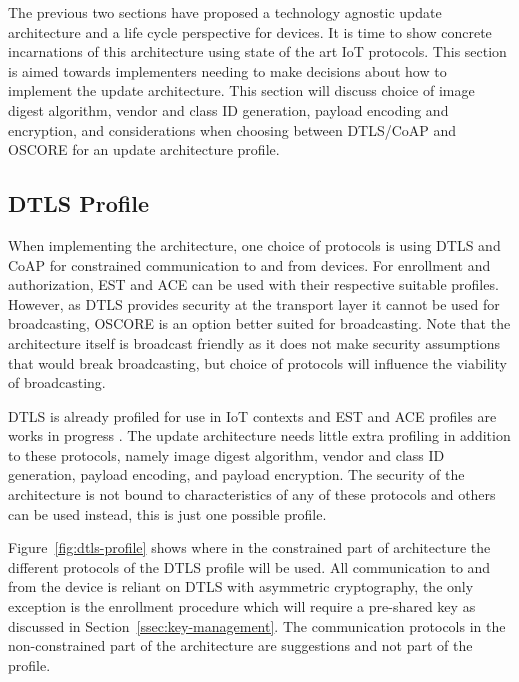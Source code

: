 \documentclass[0-thesis.tex]{subfiles}
\begin{document}
\label{chap:profiles}
The previous two sections have proposed a technology agnostic update architecture and a
life cycle perspective for devices. It is time to show concrete incarnations of this
architecture using state of the art IoT protocols. This section is aimed towards
implementers needing to make decisions about how to implement the update architecture.
This section will discuss choice of image digest algorithm, vendor and class ID
generation, payload encoding and encryption, and considerations when choosing between
DTLS/CoAP and OSCORE for an update architecture profile.

\subsection{DTLS Profile}
\label{ssec:dtls-profile}
When implementing the architecture, one choice of protocols is using DTLS and CoAP for
constrained communication to and from devices. For enrollment and authorization, EST and
ACE can be used with their respective suitable profiles. However, as DTLS provides
security at the transport layer it cannot be used for broadcasting, OSCORE is an
option better suited for broadcasting. Note that the architecture itself is broadcast
friendly as it does not make security assumptions that would break broadcasting, but
choice of protocols will influence the viability of broadcasting.

DTLS is already profiled for use in IoT contexts and EST and ACE profiles are works in
progress \parencite{rfc7925, est-coaps, ace-dtls-profile}. The update architecture needs
little extra profiling in addition to these protocols, namely image digest algorithm,
vendor and class ID generation, payload encoding, and payload encryption. The security of
the architecture is not bound to characteristics of any of these protocols and others can
be used instead, this is just one possible profile.

Figure~\ref{fig:dtls-profile} shows where in the constrained part of architecture the
different protocols of the DTLS profile will be used. All communication to and from the
device is reliant on DTLS with asymmetric cryptography, the only exception is the
enrollment procedure which will require a pre-shared key as discussed in
Section~\ref{ssec:key-management}. The communication protocols in the non-constrained part
of the architecture are suggestions and not part of the profile.
\end{document}
